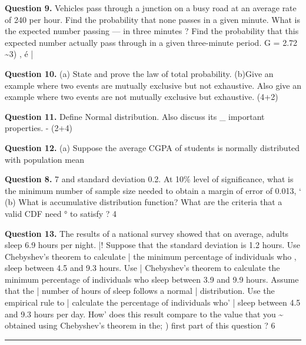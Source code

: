 \documentclass[11pt,a4paper]{article}
\begin{document}
\medskip\noindent\textbf{Question 9.} Vehicles pass through a junction on a busy
road at an average rate of 240 per hour. Find
the probability that none passes in a given
minute. What is the expected number passing —
in three minutes ? Find the probability that
this expected number actually pass through
in a given three-minute period. G = 2.72 \textasciitilde{}3) ,
é |

\medskip\noindent\textbf{Question 10.} (a) State and prove the law of total probability.
(b)Give an example where two events are
mutually exclusive but not exhaustive. Also
give an example where two events are not
mutually exclusive but exhaustive. (4+2)

\medskip\noindent\textbf{Question 11.} Define Normal distribution. Also discuss its
\_ important properties. - (2+4)

\medskip\noindent\textbf{Question 12.} (a) Suppose the average CGPA of students is
normally distributed with population mean

\medskip\noindent\textbf{Question 8.} 7 and standard deviation 0.2. At 10\% level
of significance, what is the minimum
number of sample size needed to obtain a
margin of error of 0.013,
‘  (b) What is accumulative distribution function?
What are the criteria that a valid CDF need °
to satisfy ?
4

\medskip\noindent\textbf{Question 13.} The results of a national survey showed that
on average, adults sleep 6.9 hours per night. |!
Suppose that the standard deviation is 1.2
hours. Use Chebyshev's theorem to calculate
| the minimum percentage of individuals who ,
sleep between 4.5 and 9.3 hours. Use |
Chebyshev's theorem to calculate the
minimum percentage of individuals who sleep
between 3.9 and 9.9 hours. Assume that the |
number of hours of sleep follows a normal |
distribution. Use the empirical rule to |
calculate the percentage of individuals who’ |
sleep between 4.5 and 9.3 hours per day. How’
does this result compare to the value that you \textasciitilde{}
obtained using Chebyshev's theorem in the;
) first part of this question ? 6

\bigskip{}
\rule{\linewidth}{0.4pt}\smallskip
\end{document}
